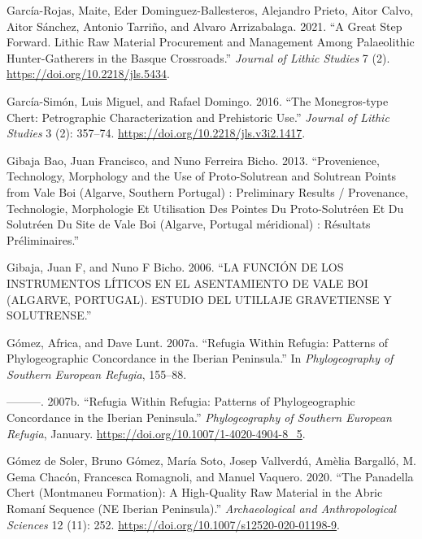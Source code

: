 \documentclass[
  a4paper,
  DIV=11,
  numbers=noendperiod]{scrreprt}
\newlength{\cslhangindent}
\newenvironment{CSLReferences}[2] %
 {\begin{list}{}{%
  \setlength{\itemindent}{0pt}
  \setlength{\leftmargin}{0pt}
  \setlength{\parsep}{0pt}
  \ifodd #1
   \setlength{\leftmargin}{\cslhangindent}
   \setlength{\itemindent}{-1\cslhangindent}
  \fi
  \setlength{\itemsep}{#2\baselineskip}}}
 {\end{list}}
\begin{document}
\begin{CSLReferences}{1}{0}
García-Rojas, Maite, Eder Dominguez-Ballesteros, Alejandro Prieto, Aitor
Calvo, Aitor Sánchez, Antonio Tarriño, and Alvaro Arrizabalaga. 2021.
{``A {Great Step Forward}. {Lithic Raw Material Procurement} and
{Management} Among {Palaeolithic Hunter-Gatherers} in the {Basque
Crossroads}.''} \emph{Journal of Lithic Studies} 7 (2).
\url{https://doi.org/10.2218/jls.5434}.

García-Simón, Luis Miguel, and Rafael Domingo. 2016. {``The
{Monegros-type} Chert: {Petrographic} Characterization and Prehistoric
Use.''} \emph{Journal of Lithic Studies} 3 (2): 357--74.
\url{https://doi.org/10.2218/jls.v3i2.1417}.

Gibaja Bao, Juan Francisco, and Nuno Ferreira Bicho. 2013.
{``Provenience, Technology, Morphology and the Use of Proto-Solutrean
and Solutrean Points from {Vale Boi} ({Algarve}, Southern Portugal) :
Preliminary Results / {Provenance}, Technologie, Morphologie Et
Utilisation Des Pointes Du Proto-Solutr{é}en Et Du Solutr{é}en Du Site
de {Vale Boi} ({Algarve}, {Portugal} m{é}ridional) : R{é}sultats
Pr{é}liminaires.''}

Gibaja, Juan F, and Nuno F Bicho. 2006. {``{LA FUNCI{Ó}N DE LOS
INSTRUMENTOS L{Í}TICOS EN EL ASENTAMIENTO DE VALE BOI (ALGARVE,
PORTUGAL). ESTUDIO DEL UTILLAJE GRAVETIENSE Y SOLUTRENSE}.''}

Gómez, Africa, and Dave Lunt. 2007a. {``Refugia Within Refugia: Patterns
of Phylogeographic Concordance in the Iberian Peninsula.''} In
\emph{Phylogeography of Southern European Refugia}, 155--88.

---------. 2007b. {``Refugia Within Refugia: Patterns of Phylogeographic
Concordance in the Iberian Peninsula.''} \emph{Phylogeography of
Southern European Refugia}, January.
\url{https://doi.org/10.1007/1-4020-4904-8_5}.

Gómez de Soler, Bruno Gómez, María Soto, Josep Vallverdú, Amèlia
Bargalló, M. Gema Chacón, Francesca Romagnoli, and Manuel Vaquero. 2020.
{``The {Panadella} Chert ({Montmaneu Formation}): A High-Quality Raw
Material in the {Abric Roman{í}} Sequence ({NE Iberian Peninsula}).''}
\emph{Archaeological and Anthropological Sciences} 12 (11): 252.
\url{https://doi.org/10.1007/s12520-020-01198-9}.


\end{CSLReferences}
\end{document}
